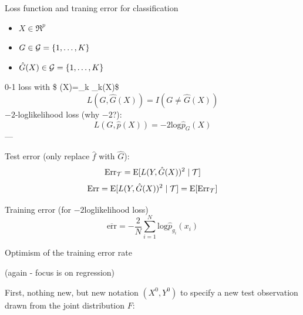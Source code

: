 \documentclass[
  ignorenonframetext,
]{beamer}
\providecommand{\tightlist}{%
  \setlength{\itemsep}{0pt}\setlength{\parskip}{0pt}}
\begin{document}
\begin{frame}

\begin{block}{Loss function and traning error for classification}

\begin{itemize}
\tightlist
\item
  \(X \in \Re^p\)
\item
  \(G \in {\cal G}=\{1,\ldots,K\}\)
\item
  \(\hat{G}(X) \in {\cal G}=\{1,\ldots,K\}\)
\end{itemize}

0-1 loss with \$ (X)=\_k \_k(X)\$
\[L(G,\hat{G}(X))=I(G\neq \hat{G}(X))\] \(-2\)-loglikelihood loss (why
\(-2\)?): \[ L(G,\hat{p}(X))=-2 \text{log} \hat{p}_G(X)\] ---

Test error (only replace \(\hat{f}\) with \(\hat{G}\)):
\[ \text{Err}_{\cal T}=\text{E}[L(Y,\hat{G}(X))^2\mid {\cal T}]\]
\[ \text{Err}=\text{E}[L(Y,\hat{G}(X))^2\mid {\cal T}]=\text{E} [\text{Err}_{\cal T}]\]

Training error (for \(-2\)loglikelihood loss)
\[\overline{\text{err}}=-\frac{2}{N}\sum_{i=1}^N \text{log}\hat{p}_{g_i}(x_i)\]

\end{block}

\end{frame}

\begin{frame}

\begin{block}{Optimism of the training error rate}

(again - focus is on regression)

First, nothing new, but new notation \((X^0,Y^0)\) to specify a new test
observation drawn from the joint distribution \(F\):

\end{block}

\end{frame}
\end{document}
